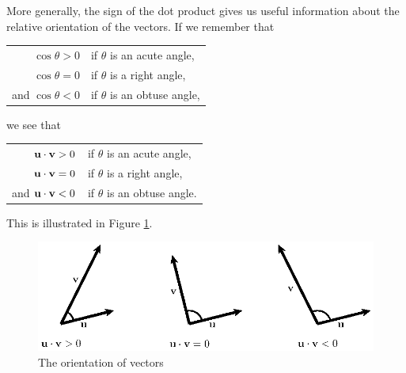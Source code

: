 \vspace*{5pt}
\nin {}
\vspace*{5pt}

More generally, the sign of the dot product gives us useful
information about the relative orientation of the vectors.   If we remember that 
\begin{center}
\begin{tabular}{rl}
  $\cos\theta > 0$ & if $\theta$ is an acute angle, \\
  $\cos\theta = 0$ & if $\theta$ is a right angle, \\
  and $\cos\theta < 0$ & if $\theta$ is an obtuse angle, \\
\end{tabular}
\end{center}

we see that
\begin{center}
\begin{tabular}{rl}
  $\mathbf{u}\cdot\mathbf{v} > 0$ & if $\theta$ is an acute angle, \\
  $\mathbf{u}\cdot\mathbf{v} = 0$ & if $\theta$ is a right angle, \\
  and $\mathbf{u}\cdot\mathbf{v} < 0$ & if $\theta$ is an obtuse angle. \\
\end{tabular}
\end{center}
This is illustrated in Figure 
\ref{F:9.3.Orientations}.

\begin{figure}[ht]
  \begin{center}
    \includegraphics{figures/fig_9_3_orientations.eps}
    \caption{The orientation of vectors}
    \label{F:9.3.Orientations}
  \end{center}
\end{figure}

\newpage


